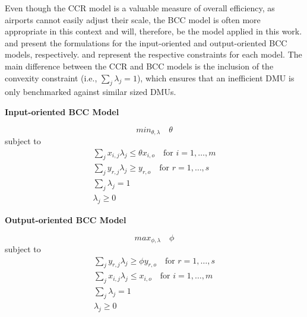 Even though the CCR model is a valuable measure of overall efficiency, as airports cannot easily adjust their scale, the BCC model is often more appropriate in this context and will, therefore, be the model applied in this work.  and  present the formulations for the input-oriented and output-oriented BCC models, respectively.  and  represent the respective constraints for each model. The main difference between the CCR and BCC models is the inclusion of the convexity constraint (i.e., \(\sum_j \lambda_j = 1\)), which ensures that an inefficient DMU is only benchmarked against similar sized DMUs. 
\begin{center}
\textbf{Input-oriented BCC Model}
\end{center}
\begin{equation}
    \label{input_dea}
min_{\theta,\lambda} \quad \theta
\end{equation}
subject to
\begin{equation}
\label{eq:bcc_constraints}
\begin{gathered}
\sum_j x_{i,j}\lambda_j \leq \theta x_{i,o} \quad \text{for } i=1,\ldots,m \\
\sum_j y_{r,j} \lambda_j \geq y_{r,o} \quad \text{for } r=1,\ldots,s \\
\sum_j \lambda_j = 1 \\
\lambda_j \geq 0
\end{gathered}
\end{equation}

\vspace{0.5cm}
\begin{center}
\textbf{Output-oriented BCC Model}
\end{center}
\begin{equation}
    \label{output_dea}
max_{\phi,\lambda} \quad \phi
\end{equation}
subject to
\begin{equation}
\label{eq:bcc_constraints_output}
\begin{gathered}
\sum_j y_{r,j} \lambda_j \geq \phi y_{r,o} \quad \text{for } r=1,\ldots,s \\
\sum_j x_{i,j}\lambda_j \leq x_{i,o} \quad \text{for } i=1,\ldots,m \\
\sum_j \lambda_j = 1 \\
\lambda_j \geq 0
\end{gathered}
\end{equation}

